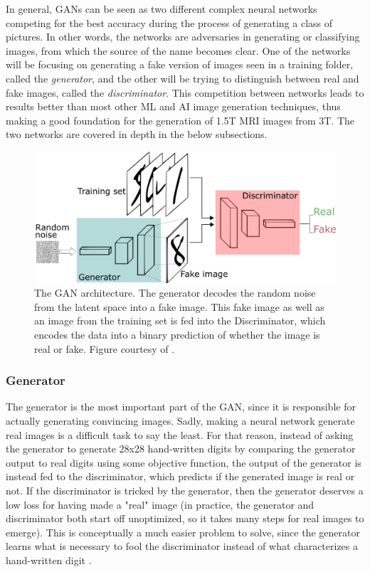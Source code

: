 \documentclass[12pt, fleqn, titlepage]{article}
\newcommand{\1}[1]{\mathds{1}\left[#1\right]}
\begin{document}
In general, GANs can be seen as two different complex neural networks competing for the best accuracy during  the process of generating a class of pictures. In other words, the networks are adversaries in generating or classifying images, from which the source of the name becomes clear. One of the networks will be focusing on generating a fake version of images seen in a training folder, called the \textit{generator}, and the other will be trying to distinguish between real and fake images, called the \textit{discriminator}. This competition between networks leads to results better than most other ML and AI image generation techniques, thus making a good foundation for the generation of 1.5T MRI images from 3T. The two networks are covered in depth in the below subsections.
\begin{figure}[H]
	\centering
	\includegraphics[width=0.7\linewidth]{"imgs/GAN architecture"}
	\caption{The GAN architecture. The generator decodes the random noise from the latent space into a fake image. This fake image as well as an image from the training set is fed into the Discriminator, which encodes the data into a binary prediction of whether the image is real or fake. Figure courtesy of \cite{gan_introduction_towards_datascience}.}
	\label{fig:gan-architecture}
\end{figure}


\subsubsection{Generator}
The generator is the most important part of the GAN, since it is responsible for actually generating convincing images. Sadly, making a neural network generate real images is a difficult task to say the least. For that reason, instead of asking the generator to generate 28x28 hand-written digits by comparing the generator output to real digits using some objective function, the output of the generator is instead fed to the discriminator, which predicts if the generated image is real or not. If the discriminator is tricked by the generator, then the generator deserves a low loss for having made a "real" image (in practice, the generator and discriminator both start off unoptimized, so it takes many steps for real images to emerge). This is conceptually a much easier problem to solve, since the generator learns what is necessary to fool the discriminator instead of what characterizes a hand-written digit \cite{developers.google_generator}.
\end{document}
